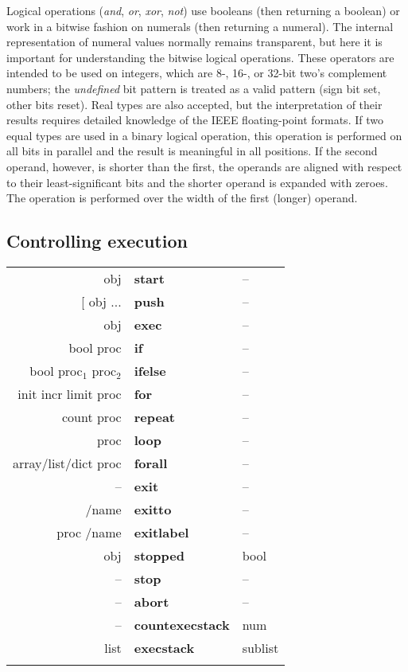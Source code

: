 Logical operations (\emph{and}, \emph{or}, \emph{xor},  \emph{not}) use booleans (then returning  a boolean) or work in a bitwise fashion on numerals (then returning a numeral). The internal representation of numeral values normally remains transparent, but here it is important for understanding the bitwise logical operations. These operators are intended to be used on integers, which are 8-, 16-, or 32-bit two's complement numbers; the \emph{undefined} bit pattern is treated as a valid pattern (sign bit set, other bits reset). Real types are also accepted, but the interpretation of their results requires detailed knowledge of the IEEE floating-point formats. If two equal types are used in a binary logical operation, this operation is performed on all bits in parallel and the result is meaningful in all positions. If the second operand, however, is shorter than the first, the operands are aligned with respect to their least-significant bits and the shorter operand is expanded with zeroes. The operation is performed over the width of the first (longer) operand.

\subsection{Controlling execution}\label{ssec:controlops}

\begin{tabular}{>{\sffamily}r>{\sffamily\bfseries}l>{\sffamily}l}
obj & start & --\\\relax
[ obj ... & push & --\\
obj & exec & --\\
bool proc & if & --\\
bool proc$_1$ proc$_2$ & ifelse & --\\
init incr limit proc & for & --\\
count proc & repeat & --\\
proc & loop & --\\
array/list/dict proc & forall & --\\
-- & exit & --\\
/name & exitto & -- \\
proc /name & exitlabel & -- \\
obj & stopped & bool\\
-- & stop & --\\
-- & abort & --\\
-- & countexecstack & num\\
list & execstack & sublist\\\\

\end{tabular}

